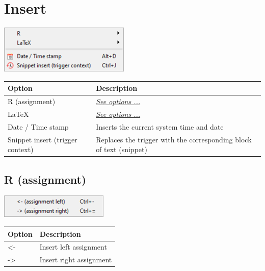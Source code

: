 
\hypertarget{menu_insert}{}
\section{Insert}

\includegraphics[scale=0.8]{./res/menu_insert.png}\\

\begin{scriptsize}
  \begin{tabularx}{\textwidth}{>{\hsize=0.3\hsize}X>{\hsize=0.7\hsize}X}\\
    \hline
    \textbf{Option} & \textbf{Description} \\
    \hline
    R (assignment) & \textit{\href{\#menu\_insert\_r}{See options ...}} \\
    \LaTeX & \textit{\href{\#menu\_insert\_latex}{See options ...}} \\
    \hdashline[1pt/1pt]
    Date / Time stamp & Inserts the current system time and date \\
    Snippet insert (trigger context) & Replaces the trigger with the corresponding block of text (snippet) \\
    \hline
  \end{tabularx}
\end{scriptsize}


\hypertarget{menu_insert_r}{}
\subsection{R (assignment)}

\includegraphics[scale=0.8]{./res/menu_insert_r_assignment.png}\\

\begin{scriptsize}
  \begin{tabularx}{\textwidth}{>{\hsize=0.3\hsize}X>{\hsize=0.7\hsize}X}\\
    \hline
    \textbf{Option} & \textbf{Description} \\
    \hline
    <- & Insert left assignment \\
    -> & Insert right assignment \\
    \hline
  \end{tabularx}
\end{scriptsize}


